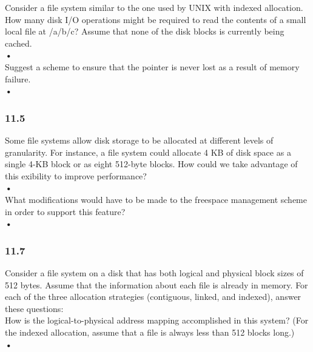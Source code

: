 \documentclass[a4paper,10pt,titlepage]{report}
\begin{document}
\hspace{10mm}Consider a file system similar to the one used by UNIX with indexed allocation. How many disk I/O operations might be required to read the contents of a small local file at /a/b/c? Assume that none of the disk blocks is currently being cached.\\
\hspace{15mm} \textbf{•} \\

\hspace{10mm}Suggest a scheme to ensure that the pointer is never lost as a result of memory failure.\\
\hspace{15mm} \textbf{•} \\



\subsubsection{11.5}
Some file systems allow disk storage to be allocated at different levels of granularity. For instance, a file system could allocate 4 KB of disk space as a single 4-KB block or as eight 512-byte blocks. How could we take advantage of this exibility to improve performance?
\\
\hspace{15mm} \textbf{•} \\

What modifications would have to be made to the freespace management scheme in order to support this feature?\\
\hspace{15mm} \textbf{•} \\


\subsubsection{11.7}
Consider a file system on a disk that has both logical and physical block sizes of 512 bytes. Assume that the information about each file is already in memory. For each of the three allocation strategies (contiguous, linked, and indexed), answer these questions:
\\
\hspace{10mm}How is the logical-to-physical address mapping accomplished in this system? (For the indexed allocation, assume that a file is always less than 512 blocks long.)
\\
\hspace{15mm} \textbf{•} \\
\end{document}
